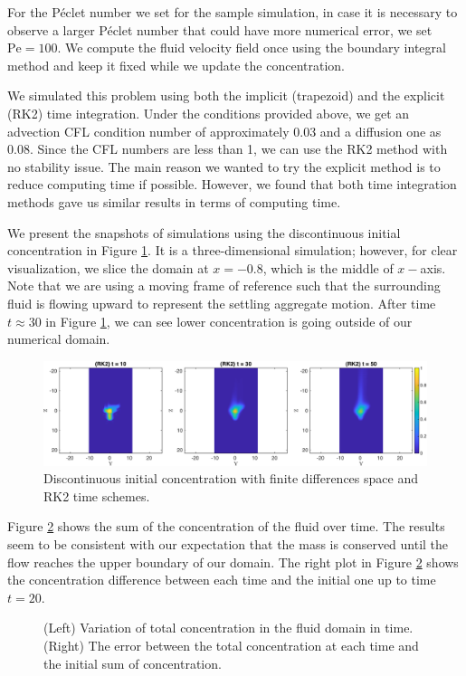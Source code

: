 For the Péclet number we set for the sample simulation, in case it is necessary to observe a larger Péclet number that could have more numerical error, we set $\text{Pe} = 100$.
We compute the fluid velocity field once using the boundary integral method and keep it fixed while we update the concentration. 
\par
We simulated this problem using both the implicit (trapezoid) and the explicit (RK2) time integration. Under the conditions provided above, we get an advection CFL condition number of approximately 0.03 and a diffusion one as 0.08. Since the CFL numbers are less than 1, we can use the RK2 method with no stability issue. 
The main reason we wanted to try the explicit method is to reduce computing time if possible. However, we found that both time integration methods gave us similar results in terms of computing time.
\par
We present the snapshots of simulations using the discontinuous initial concentration in Figure \ref{fig_ic4_RK2_snap135}. It is a three-dimensional simulation; however, for clear visualization, we slice the domain at $x= -0.8$, which is the middle of $x-$axis.
 Note that we are using a moving frame of reference such that the surrounding fluid is flowing upward to represent the settling aggregate motion.
After time $t \approx 30$ in Figure \ref{fig_ic4_RK2_snap135}, we can see lower concentration is going outside of our numerical domain.  
 \begin{figure}[h]
 \begin{center}
	\includegraphics[scale=0.75]{./figures/fig_ic4_RK2_snap135}
 \end{center}
 \caption{Discontinuous initial concentration with finite differences space and RK2 time schemes.}
 \label{fig_ic4_RK2_snap135}
 \end{figure}
 
Figure \ref{fig_sumC} shows the sum of the concentration of the fluid over time.
The results seem to be consistent with our expectation that the mass is conserved until the flow reaches the upper boundary of our domain. The right plot in Figure \ref{fig_sumC} shows the concentration difference between each time and the initial one up to time $t = 20$. 
 \begin{figure}[ht]
 \begin{center}
 \end{center}
 \caption{(Left) Variation of total concentration in the fluid domain in time. (Right) The error between the total concentration at each time and the initial sum of concentration.}
 \label{fig_sumC}
 \end{figure}
